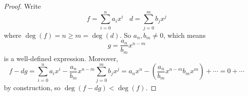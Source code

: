 \documentclass[linearalgebraII]{subfiles}
\begin{document}
    \begin{proof}
        Write
        \begin{equation*}
            f = \sum^n_{i=0} a_ix^i \ \ \ \ d = \sum^m_{j=0} b_jx^j
        \end{equation*}
        where $\deg(f) = n \geq m = \deg(d)$. So $a_n, b_m\neq 0$, which means
        \begin{equation*}
            g = \frac{a_n}{b_m}x^{n-m}
        \end{equation*}
        is a well-defined expression. Moreover,
        \begin{equation*}
            f - dg = \sum^n_{i=0} a_ix^i - \frac{a_n}{b_m}x^{n-m} \sum^m_{j=0} b_jx^j = a_nx^n - \left(\frac{a_n}{b_m}x^{n-m} b_mx^m\right) + \cdots = 0 + \cdots
        \end{equation*}
        by construction, so $\deg(f-dg) < \deg(f)$. 
    \end{proof}
\end{document}
